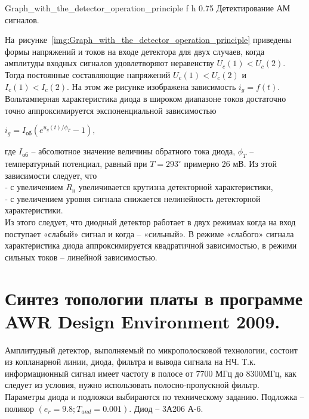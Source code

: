 \documentclass{bmstu}
\begin{document}
		{Graph_with_the_detector_operation_principle}
		{f} %
		{h} %
		{0.75\textwidth} %
		{Детектирование АМ сигналов.} %
	
\indent	На~рисунке~\ref{img:Graph_with_the_detector_operation_principle} приведены 
	формы
	напряжений и токов на входе детектора для двух случаев, когда амплитуды входных
	сигналов удовлетворяют неравенству $U_c(1) < U_c(2)$. Тогда постоянные 
	составляющие напряжений $U_c(1) < U_c(2)$ и $I_c(1) < I_c(2)$. На этом же 
	рисунке изображена зависимость $i_g = f(t)$. \\
\indent	Вольтамперная характеристика диода в широком диапазоне токов достаточно 
	точно аппроксимируется экспоненциальной зависимостью
	\begin{center}
		$i_g = I_\text{об} (e^{u_g(t)/\phi_T} - 1),$
	\end{center}

\indent где $I_\text{об}$ – абсолютное значение величины обратного тока диода,
	$\phi_T$ – температурный потенциал, равный при $T = 293^{\circ}$ примерно 26
	мВ. Из этой зависимости следует, что \\
\indent	‐ с увеличением $R_\text{н}$ увеличивается крутизна детекторной
	характеристики, \\
\indent	‐ с увеличением уровня сигнала снижается нелинейность детекторной 
	характеристики. \\
\indent	Из этого следует, что диодный детектор работает в двух режимах когда на вход
	поступает «слабый» сигнал и когда – «сильный». В режиме «слабого» сигнала
	характеристика диода аппроксимируется квадратичной зависимостью, в режими 
	сильных токов – линейной зависимостью.
	
	
	\chapter{Синтез топологии платы в программе AWR Design Environment 2009.}
	
	Амплитудный детектор, выполняемый по микрополосковой технологии, состоит из 
	копланарной линии, диода, фильтра и вывода сигнала на НЧ. Т.к. информационный 
	сигнал имеет частоту в полосе от 7700 МГц до 8300МГц, как следует из условия, 
	нужно использовать полосно‐пропускной фильтр. \\
\indent	Параметры диода и подложки выбираются по техническому заданию. Подложка – 
	поликор $(e_r = 9.8; T_{and} = 0.001)$. Диод – 3А206 А‐6.
	
\end{document}
